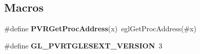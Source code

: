 \subsection*{Macros}
\begin{DoxyCompactItemize}
\item 
\hypertarget{group___a_p_i___o_g_l_e_s3_ga4d75a8396541a8b002cc3b1b4f292604}{\#define {\bfseries P\+V\+R\+Get\+Proc\+Address}(x)~egl\+Get\+Proc\+Address(\#x)}\label{group___a_p_i___o_g_l_e_s3_ga4d75a8396541a8b002cc3b1b4f292604}

\item 
\hypertarget{group___a_p_i___o_g_l_e_s3_ga2eb4395839440f4db904a0cd3c6061f4}{\#define {\bfseries G\+L\+\_\+\+P\+V\+R\+T\+G\+L\+E\+S\+E\+X\+T\+\_\+\+V\+E\+R\+S\+I\+O\+N}~3}\label{group___a_p_i___o_g_l_e_s3_ga2eb4395839440f4db904a0cd3c6061f4}

\end{DoxyCompactItemize}
